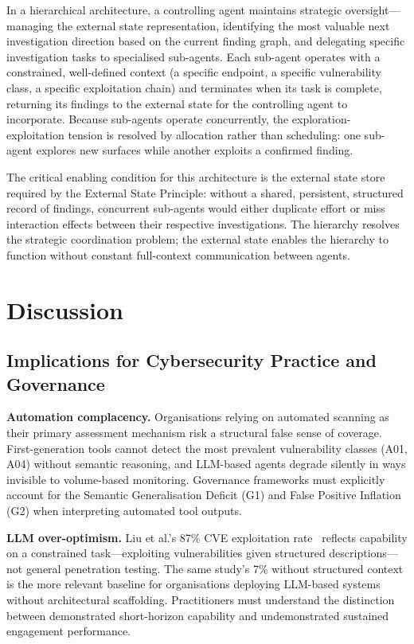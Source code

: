 \documentclass[12pt,a4paper,oneside,openany]{book}
\begin{document}
In a hierarchical architecture, a controlling agent maintains strategic oversight---managing the external state representation, identifying the most valuable next investigation direction based on the current finding graph, and delegating specific investigation tasks to specialised sub-agents. Each sub-agent operates with a constrained, well-defined context (a specific endpoint, a specific vulnerability class, a specific exploitation chain) and terminates when its task is complete, returning its findings to the external state for the controlling agent to incorporate. Because sub-agents operate concurrently, the exploration-exploitation tension is resolved by allocation rather than scheduling: one sub-agent explores new surfaces while another exploits a confirmed finding.

The critical enabling condition for this architecture is the external state store required by the External State Principle: without a shared, persistent, structured record of findings, concurrent sub-agents would either duplicate effort or miss interaction effects between their respective investigations. The hierarchy resolves the strategic coordination problem; the external state enables the hierarchy to function without constant full-context communication between agents.

\chapter{Discussion}
\label{ch:discussion}

\section{Implications for Cybersecurity Practice and Governance}

\textbf{Automation complacency.} Organisations relying on automated scanning as their primary assessment mechanism risk a structural false sense of coverage. First-generation tools cannot detect the most prevalent vulnerability classes (A01, A04) without semantic reasoning, and LLM-based agents degrade silently in ways invisible to volume-based monitoring. Governance frameworks must explicitly account for the Semantic Generalisation Deficit (G1) and False Positive Inflation (G2) when interpreting automated tool outputs.

\textbf{LLM over-optimism.} Liu et al.'s 87\% CVE exploitation rate~\citep{liu2024gpts} reflects capability on a constrained task---exploiting vulnerabilities given structured descriptions---not general penetration testing. The same study's 7\% without structured context is the more relevant baseline for organisations deploying LLM-based systems without architectural scaffolding. Practitioners must understand the distinction between demonstrated short-horizon capability and undemonstrated sustained engagement performance.
\end{document}
